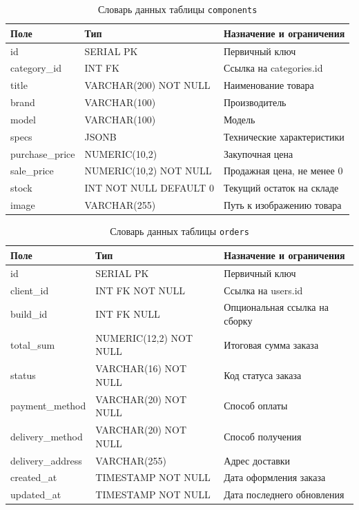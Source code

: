 \documentclass[14pt, a4paper]{extarticle}
\begin{document}
\begin{table}[ht!]
\caption{Словарь данных таблицы \texttt{components}}
\label{tab:dd-components}
\small
\begin{tabularx}{\textwidth}{|>{\RaggedRight\arraybackslash}p{}|>{\RaggedRight\arraybackslash}p{}|>{\RaggedRight\arraybackslash}X|}
\hline
\textbf{Поле} & \textbf{Тип} & \textbf{Назначение и ограничения} \\ \hline
id & SERIAL PK & Первичный ключ \\ \hline
category\_id & INT FK & Ссылка на categories.id \\ \hline
title & VARCHAR(200) NOT NULL & Наименование товара \\ \hline
brand & VARCHAR(100) & Производитель \\ \hline
model & VARCHAR(100) & Модель \\ \hline
specs & JSONB & Технические характеристики \\ \hline
purchase\_price & NUMERIC(10,2) & Закупочная цена \\ \hline
sale\_price & NUMERIC(10,2) NOT NULL & Продажная цена, не менее 0 \\ \hline
stock & INT NOT NULL DEFAULT 0 & Текущий остаток на складе \\ \hline
image & VARCHAR(255) & Путь к изображению товара \\ \hline
\end{tabularx}
\end{table}

\begin{table}[ht!]
\caption{Словарь данных таблицы \texttt{orders}}
\label{tab:dd-orders}
\small
\begin{tabularx}{\textwidth}{|>{\RaggedRight\arraybackslash}p{}|>{\RaggedRight\arraybackslash}p{}|>{\RaggedRight\arraybackslash}X|}
\hline
\textbf{Поле} & \textbf{Тип} & \textbf{Назначение и ограничения} \\ \hline
id & SERIAL PK & Первичный ключ \\ \hline
client\_id & INT FK NOT NULL & Ссылка на users.id \\ \hline
build\_id & INT FK NULL & Опциональная ссылка на сборку \\ \hline
total\_sum & NUMERIC(12,2) NOT NULL & Итоговая сумма заказа \\ \hline
status & VARCHAR(16) NOT NULL & Код статуса заказа \\ \hline
payment\_method & VARCHAR(20) NOT NULL & Способ оплаты \\ \hline
delivery\_method & VARCHAR(20) NOT NULL & Способ получения \\ \hline
delivery\_address & VARCHAR(255) & Адрес доставки \\ \hline
created\_at & TIMESTAMP NOT NULL & Дата оформления заказа \\ \hline
updated\_at & TIMESTAMP NOT NULL & Дата последнего обновления \\ \hline
\end{tabularx}
\end{table}
\end{document}
